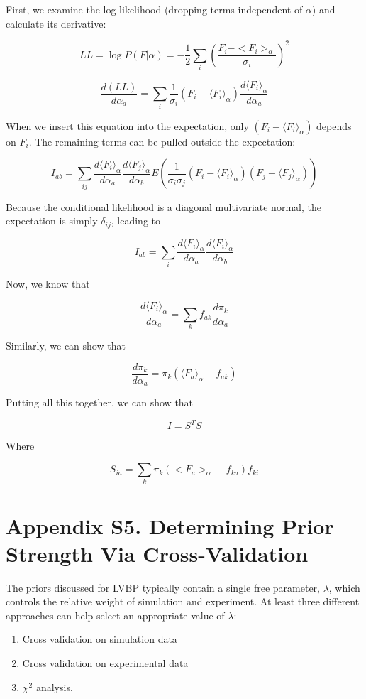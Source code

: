 \documentclass[journal=jacsat,manuscript=article]{achemso}
\begin{document}
First, we examine the log likelihood (dropping terms independent of $\alpha$) and calculate its derivative:

$$LL = \log P(F|\alpha) = - \frac{1}{2}\sum_i (\frac{F_i - <F_i>_\alpha}{\sigma_i})^2$$

$$\frac{d(LL)}{d\alpha_a} = \sum_i \frac{1}{\sigma_i}(F_i - \langle F_i \rangle_\alpha) \frac{d\langle F_i \rangle_\alpha}{d\alpha_a}$$

When we insert this equation into the expectation, only $(F_i - \langle F_i \rangle_\alpha)$ depends on $F_i$.  The remaining terms can be pulled outside the expectation:

$$I_{ab} = \sum_{ij} \frac{d\langle F_i \rangle_\alpha}{d\alpha_a} \frac{d\langle F_j \rangle_\alpha}{d\alpha_b} E(\frac{1}{\sigma_i \sigma_j}(F_i - \langle F_i \rangle_\alpha)(F_j - \langle F_j \rangle_\alpha))$$

Because the conditional likelihood is a diagonal multivariate normal, the expectation is simply $\delta_{ij}$, leading to 

$$I_{ab} = \sum_{i} \frac{d\langle F_i \rangle_\alpha}{d\alpha_a} \frac{d\langle F_i \rangle_\alpha}{d\alpha_b} $$

Now, we know that 

$$\frac{d\langle F_i \rangle_\alpha}{d\alpha_a} = \sum_k f_{ak} \frac{d\pi_k}{d\alpha_a}$$

Similarly, we can show that

$$\frac{d\pi_k}{d\alpha_a} = \pi_k (\langle F_a \rangle_{\alpha} - f_{ak})$$


Putting all this together, we can show that

$$I = S^T S$$

Where 

$$S_{ia} = \sum_k \pi_k (<F_a>_\alpha - f_{ka}) f_{ki}$$

\section{Appendix S5.  Determining Prior Strength Via Cross-Validation}

The priors discussed for LVBP typically contain a single free parameter, $\lambda$, which controls the relative weight of simulation and experiment.  At least three different approaches can help select an appropriate value of $\lambda$:

\begin{enumerate}
 \item Cross validation on simulation data
 \item Cross validation on experimental data
 \item $\chi^2$ analysis.  
\end{enumerate}
\end{document}
